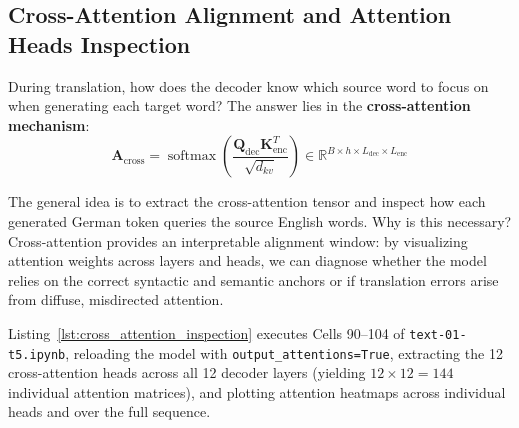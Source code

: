\documentclass[11pt,a4paper]{article}
\begin{document}
\subsection{Cross-Attention Alignment and Attention Heads Inspection}

During translation, how does the decoder know which source word to focus on when generating each target word? The answer lies in the \textbf{cross-attention mechanism}:
\begin{equation}
\mathbf{A}_{\text{cross}} = \operatorname{softmax}\left(\frac{\mathbf{Q}_{\text{dec}} \mathbf{K}_{\text{enc}}^T}{\sqrt{d_{kv}}}\right) \in \mathbb{R}^{B \times h \times L_{\text{dec}} \times L_{\text{enc}}}
\end{equation}

The general idea is to extract the cross-attention tensor and inspect how each generated German token queries the source English words. Why is this necessary? Cross-attention provides an interpretable alignment window: by visualizing attention weights across layers and heads, we can diagnose whether the model relies on the correct syntactic and semantic anchors or if translation errors arise from diffuse, misdirected attention.

Listing~\ref{lst:cross_attention_inspection} executes Cells 90--104 of \texttt{text-01-t5.ipynb}, reloading the model with \texttt{output\_attentions=True}, extracting the 12 cross-attention heads across all 12 decoder layers (yielding $12 \times 12 = 144$ individual attention matrices), and plotting attention heatmaps across individual heads and over the full sequence.
\end{document}
